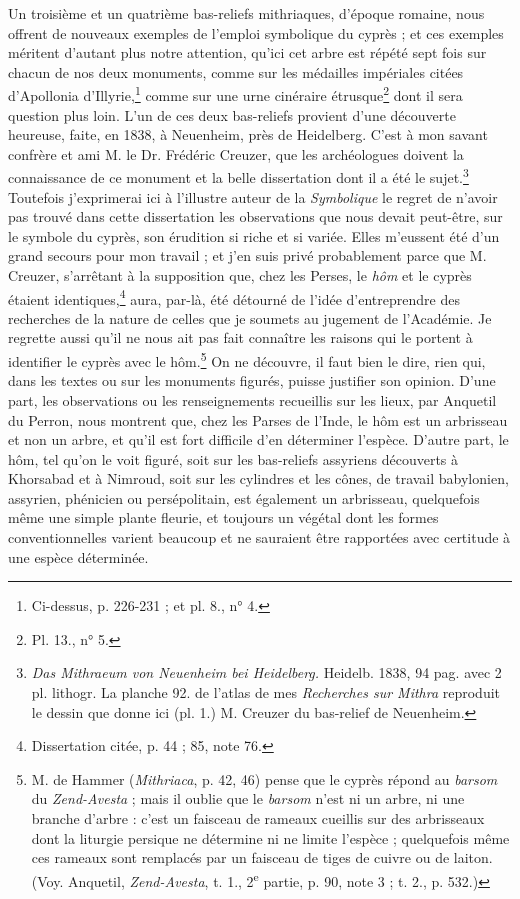 \documentclass{article}
\begin{document}
Un troisième et un quatrième bas-reliefs mithriaques, d'époque romaine, nous offrent de nouveaux exemples de l'emploi symbolique du cyprès ; et ces exemples méritent d'autant plus notre attention, qu'ici cet arbre est répété sept fois sur chacun de nos deux monuments, comme sur les médailles impériales citées d'Apollonia d'Illyrie,\footnote{Ci-dessus, p. 226-231 ; et pl. 8., n° 4.} comme sur une urne cinéraire étrusque\footnote{Pl. 13., n° 5.} dont il sera question plus loin. L'un de ces deux bas-reliefs provient d'une découverte heureuse, faite, en 1838, à Neuenheim, près de Heidelberg. C'est à mon savant confrère et ami M. le Dr. Frédéric Creuzer, que les archéologues doivent la connaissance de ce monument et la belle dissertation dont il a été le sujet.\footnote{\emph{Das Mithraeum von Neuenheim bei Heidelberg.} Heidelb. 1838, 94 pag. avec 2 pl. lithogr. La planche 92. de l'atlas de mes \emph{Recherches sur Mithra} reproduit le dessin que donne ici (pl. 1.) M. Creuzer du bas-relief de Neuenheim.} Toutefois j'exprimerai ici à l'illustre auteur de la \emph{Symbolique} le regret de n'avoir pas trouvé dans cette dissertation les observations que nous devait peut-être, sur le symbole du cyprès, son érudition si riche et si variée. Elles m'eussent été d'un grand secours pour mon travail ; et j'en suis privé probablement parce que M. Creuzer, s'arrêtant à la supposition que, chez les Perses, le \emph{hôm} et le cyprès étaient identiques,\footnote{Dissertation citée, p. 44 ; 85, note 76.} aura, par-là, été détourné de l'idée d'entreprendre des recherches de la nature de celles que je soumets au jugement de l'Académie. Je regrette aussi qu'il ne nous ait pas fait connaître les raisons qui le portent à identifier le cyprès avec le hôm.\footnote{M. de Hammer (\emph{Mithriaca}, p. 42, 46) pense que le cyprès répond au \emph{barsom} du \emph{Zend-Avesta} ; mais il oublie que le \emph{barsom} n'est ni un arbre, ni une branche d'arbre : c'est un faisceau de rameaux cueillis sur des arbrisseaux dont la liturgie persique ne détermine ni ne limite l'espèce ; quelquefois même ces rameaux sont remplacés par un faisceau de tiges de cuivre ou de laiton. (Voy. Anquetil, \emph{Zend-Avesta}, t. 1., 2\textsuperscript{e} partie, p. 90, note 3 ; t. 2., p. 532.)} On ne découvre, il faut bien le dire, rien qui, dans les textes ou sur les monuments figurés, puisse justifier son opinion. D'une part, les observations ou les renseignements recueillis sur les lieux, par Anquetil du Perron, nous montrent que, chez les Parses de l'Inde, le hôm est un arbrisseau et non un arbre, et qu'il est fort difficile d'en déterminer l'espèce. D'autre part, le hôm, tel qu'on le voit figuré, soit sur les bas-reliefs assyriens découverts à Khorsabad et à Nimroud, soit sur les cylindres et les cônes, de travail babylonien, assyrien, phénicien ou persépolitain, est également un arbrisseau, quelquefois même une simple plante fleurie, et toujours un végétal dont les formes conventionnelles varient beaucoup et ne sauraient être rapportées avec certitude à une espèce déterminée.
\end{document}
